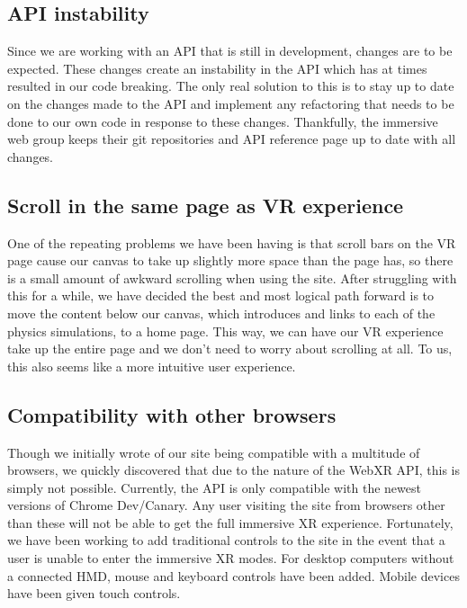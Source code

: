 \documentclass[onecolumn, draftclsnofoot,10pt, compsoc]{IEEEtran}
\begin{document}
\subsection{API instability}
Since we are working with an API that is still in development, changes are to be expected. These changes create an instability in the API which has at times resulted in our code breaking. The only real solution to this is to stay up to date on the changes made to the API and implement any refactoring that needs to be done to our own code in response to these changes. Thankfully, the immersive web group keeps their git repositories and API reference page up to date with all changes. 

\subsection{Scroll in the same page as VR experience}
One of the repeating problems we have been having is that scroll bars on the VR page cause our canvas to take up slightly more space than the page has, so there is a small amount of awkward scrolling when using the site. After struggling with this for a while, we have decided the best and most logical path forward is to move the content below our canvas, which introduces and links to each of the physics simulations, to a home page. This way, we can have our VR experience take up the entire page and we don't need to worry about scrolling at all. To us, this also seems like a more intuitive user experience.


\subsection{Compatibility with other browsers}
Though we initially wrote of our site being compatible with a multitude of browsers, we quickly discovered that due to the nature of the WebXR API, this is simply not possible. Currently, the API is only compatible with the newest versions of Chrome Dev/Canary. Any user visiting the site from browsers other than these will not be able to get the full immersive XR experience. Fortunately, we have been working to add traditional controls to the site in the event that a user is unable to enter the immersive XR modes. For desktop computers without a connected HMD, mouse and keyboard controls have been added. Mobile devices have been given touch controls.
\end{document}
